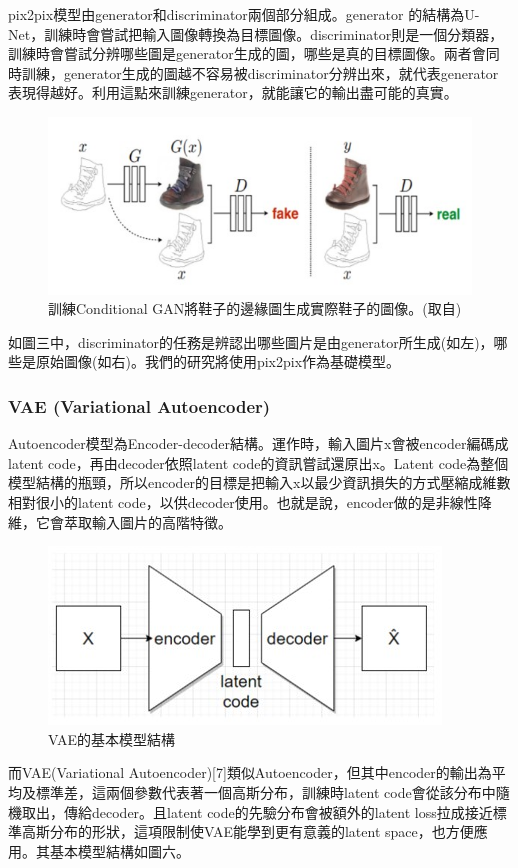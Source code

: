 \documentclass[a4paper, 12pt]{article}
\begin{document}
pix2pix模型由generator和discriminator兩個部分組成。generator 的結構為U-Net，訓練時會嘗試把輸入圖像轉換為目標圖像。discriminator則是一個分類器，訓練時會嘗試分辨哪些圖是generator生成的圖，哪些是真的目標圖像。兩者會同時訓練，generator生成的圖越不容易被discriminator分辨出來，就代表generator表現得越好。利用這點來訓練generator，就能讓它的輸出盡可能的真實。

\begin{figure}[htbp]
    \centering
    \includegraphics[width=0.6\linewidth]{fig/3.jpg}
    \caption{訓練Conditional GAN將鞋子的邊緣圖生成實際鞋子的圖像。(取自\cite{isola2017image})}
    \label{fig:3}
\end{figure}

如圖三中，discriminator的任務是辨認出哪些圖片是由generator所生成(如左)，哪些是原始圖像(如右)。我們的研究將使用pix2pix作為基礎模型。

\subsubsection{VAE (Variational Autoencoder)}
Autoencoder模型為Encoder-decoder結構。運作時，輸入圖片x會被encoder編碼成latent code，再由decoder依照latent code的資訊嘗試還原出x。Latent code為整個模型結構的瓶頸，所以encoder的目標是把輸入x以最少資訊損失的方式壓縮成維數相對很小的latent code，以供decoder使用。也就是說，encoder做的是非線性降維，它會萃取輸入圖片的高階特徵。


\begin{figure}[htbp]
    \centering
    \includegraphics[width=0.5\linewidth]{fig/4.jpg}
    \caption{VAE的基本模型結構}
    \label{fig:4}
\end{figure}

而VAE(Variational Autoencoder)[7]類似Autoencoder，但其中encoder的輸出為平均及標準差，這兩個參數代表著一個高斯分布，訓練時latent code會從該分布中隨機取出，傳給decoder。且latent code的先驗分布會被額外的latent loss拉成接近標準高斯分布的形狀，這項限制使VAE能學到更有意義的latent space，也方便應用。其基本模型結構如圖六。
\end{document}
